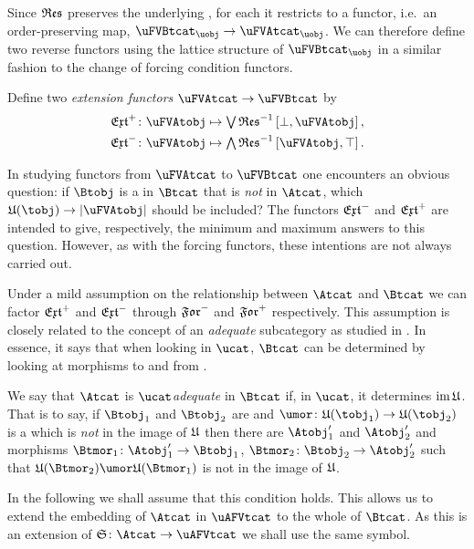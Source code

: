 \documentclass[%
12pt,%
arxiv,%
defaults
]{myclass}
\begin{document}
Since \(\resfunc\) preserves the underlying \uobjs, for each \uobj[\uobj] it restricts to a functor, i.e.\ an order\hyp{}preserving map, \(\uFVBtcat_{\uobj} \to \uFVAtcat_{\uobj}\).
We can therefore define two reverse functors using the lattice structure of \(\uFVBtcat_{\uobj}\) in a similar fashion to the change of forcing condition functors.

\begin{defn}
Define two \emph{extension functors} \(\uFVAtcat \to \uFVBtcat\) by
%
\begin{align*}
  \Jextfunc \colon \uFVAtobj &\mapsto \join \resfunc^{-1}\left[\bot,\uFVAtobj\right], \\
%
  \Mextfunc \colon \uFVAtobj &\mapsto \meet \resfunc^{-1}\left[\uFVAtobj,\top\right].
\end{align*}
\end{defn}

In studying functors from \(\uFVAtcat\) to \(\uFVBtcat\) one encounters an obvious question: if \(\Btobj\) is a \Btobj in \(\Btcat\) that is \emph{not} in \(\Atcat\), which \umors \(\ufunc(\tobj) \to \forfunc[\uFVAtobj]\) should be included?
The functors \(\Mextfunc\) and \(\Jextfunc\) are intended to give, respectively, the minimum and maximum answers to this question.
However, as with the forcing functors, these intentions are not always carried out.

Under a mild assumption on the relationship between \(\Atcat\) and \(\Btcat\) we can factor \(\Jextfunc\) and \(\Mextfunc\) through \(\Jforfunc\) and \(\Mforfunc\) respectively.
This assumption is closely related to the concept of an \emph{adequate} subcategory as studied in \cite{ji3}.
In essence, it says that when looking in \(\ucat\), \(\Btcat\) can be determined by looking at morphisms to and from \Atobjalts.

\begin{defn}
We say that \(\Atcat\) is \emph{\(\ucat\)\enhyp{}adequate} in \(\Btcat\) if, in \(\ucat\), it determines \(\im \ufunc\).
That is to say, if \(\Btobj_1\) and \(\Btobj_2\) are \Btobjalts and \(\umor \colon \ufunc(\tobj_1) \to \ufunc(\tobj_2)\) is a \umor which is \emph{not} in the image of \(\ufunc\) then there are \Atobjalts \(\Atobj_1'\) and \(\Atobj_2'\) and morphisms \(\Btmor_1 \colon \Atobj_1' \to \Btobj_1\), \(\Btmor_2 \colon \Btobj_2 \to \Atobj_2'\) such that \(\ufunc(\Btmor_2) \umor \ufunc(\Btmor_1)\) is not in the image of \(\ufunc\).
\end{defn}

In the following we shall assume that this condition holds.
This allows us to extend the embedding of \(\Atcat\) in \(\uAFVtcat\) to the whole of \(\Btcat\).
As this is an extension of \(\sfunc \colon \Atcat \to \uAFVtcat\) we shall use the same symbol.
\end{document}
